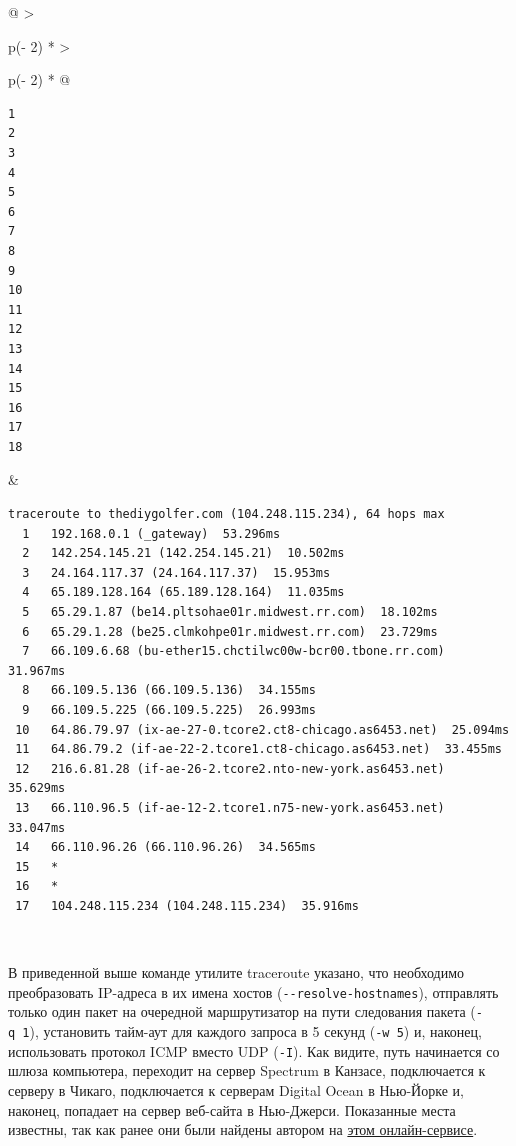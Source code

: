 \documentclass{article}
\begin{document}
\begin{longtable}[]{@{}
  >{\raggedright\arraybackslash}p{(\columnwidth - 2\tabcolsep) * }
  >{\raggedright\arraybackslash}p{(\columnwidth - 2\tabcolsep) * }@{}}
\toprule
\endhead
\begin{minipage}[t]{\linewidth}\raggedright
\begin{verbatim}
1
2
3
4
5
6
7
8
9
10
11
12
13
14
15
16
17
18
\end{verbatim}
\end{minipage} & \begin{minipage}[t]{\linewidth}\raggedright
\begin{verbatim}
traceroute to thediygolfer.com (104.248.115.234), 64 hops max
  1   192.168.0.1 (_gateway)  53.296ms
  2   142.254.145.21 (142.254.145.21)  10.502ms
  3   24.164.117.37 (24.164.117.37)  15.953ms
  4   65.189.128.164 (65.189.128.164)  11.035ms
  5   65.29.1.87 (be14.pltsohae01r.midwest.rr.com)  18.102ms
  6   65.29.1.28 (be25.clmkohpe01r.midwest.rr.com)  23.729ms
  7   66.109.6.68 (bu-ether15.chctilwc00w-bcr00.tbone.rr.com)  31.967ms
  8   66.109.5.136 (66.109.5.136)  34.155ms
  9   66.109.5.225 (66.109.5.225)  26.993ms
 10   64.86.79.97 (ix-ae-27-0.tcore2.ct8-chicago.as6453.net)  25.094ms
 11   64.86.79.2 (if-ae-22-2.tcore1.ct8-chicago.as6453.net)  33.455ms
 12   216.6.81.28 (if-ae-26-2.tcore2.nto-new-york.as6453.net)  35.629ms
 13   66.110.96.5 (if-ae-12-2.tcore1.n75-new-york.as6453.net)  33.047ms
 14   66.110.96.26 (66.110.96.26)  34.565ms
 15   *
 16   *
 17   104.248.115.234 (104.248.115.234)  35.916ms
\end{verbatim}
\end{minipage} \\ \addlinespace
\bottomrule
\end{longtable}

В приведенной выше команде утилите traceroute указано, что необходимо
преобразовать IP-адреса в их имена хостов
(\texttt{-\/-resolve-hostnames}), отправлять только один пакет на
очередной маршрутизатор на пути следования пакета (\texttt{-q\ 1}),
установить тайм-аут для каждого запроса в 5 секунд (\texttt{-w\ 5}) и,
наконец, использовать протокол ICMP вместо UDP (\texttt{-I}). Как
видите, путь начинается со шлюза компьютера, переходит на сервер
Spectrum в Канзасе, подключается к серверу в Чикаго, подключается к
серверам Digital Ocean в Нью-Йорке и, наконец, попадает на сервер
веб-сайта в Нью-Джерси. Показанные места известны, так как ранее они
были найдены автором на
\href{https://whatismyipaddress.com/ip-lookup}{этом онлайн-сервисе}.
\end{document}
